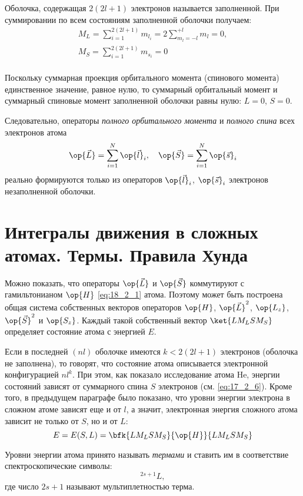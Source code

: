 Оболочка, содержащая $2(2l + 1)$ электронов называется заполненной. При суммировании по всем состояниям заполненной оболочки получаем:
\begin{gather*}
M_L = \sum_{i = 1}^{2(2l+1)} m_{l_i} = 2 \sum_{m_l=-l}^{+l} m_l = 0, \\ 
M_S = \sum_{i = 1}^{2(2l+1)} m_{s_i} = 0\\
\end{gather*}

Поскольку суммарная проекция орбитального момента (спинового момента) единственное значение, равное нулю, то суммарный орбитальный момент и суммарный спиновые момент заполненной оболочки равны нулю: $L=0$, $S=0$.

Следовательно, операторы {\em полного орбитального момента} и {\em полного спина} всех электронов атома
\begin{equation}
\label{eq:18_2_4}
\op{\vec{L}} = \sum_{i = 1}^{N} \op{\vec{l}}_i,~~~\op{\vec{S}} = \sum_{i = 1}^{N} \op{\vec{s}}_i
\end{equation}
реально формируются только из операторов $\op{\vec{l}}_i$, $\op{\vec{s}}_i$ электронов незаполненной оболочки.

\section{Интегралы движения в сложных атомах. Термы. Правила Хунда}

Можно показать, что операторы $\op{\vec{L}}$ и $\op{\vec{S}}$ коммутируют с гамильтонианом $\op{H}$ \eqref{eq:18_2_1} атома. Поэтому может быть построена общая система собственных векторов операторов  $\op{H}$, $\op{\vec{L}}^2$, $\op{L_z}$, $\op{\vec{S}}^2$ и $\op{S_z}$. Каждый такой собственный вектор $\ket{L M_L S M_S}$ определяет состояние атома с энергией $E$.

Если в последней $(nl)$ оболочке имеются $k < 2(2l+1)$ электронов (оболочка не заполнена), то говорят, что состояние атома описывается электронной конфигурацией $nl^k$. При этом, как показало исследование атома He, энергии состояний зависят от суммарного спина $S$ электронов (см. \eqref{eq:17_2_6}). Кроме того, в предыдущем параграфе было показано, что уровни энергии электрона в сложном атоме зависят еще и от $l$, а значит, электронная энергия сложного атома зависит не только от $S$, но и от $L$:
$$
E = E(S, L) = \bfk{L M_L S M_S}{\op{H}}{L M_L S M_S}
$$ 

Уровни энергии атома принято называть {\em термами} и ставить им в соответствие спектроскопические символы:
$$\boxed{^{2s+1}L},$$
где число $2s+1$ называют мультиплетностью терма.

